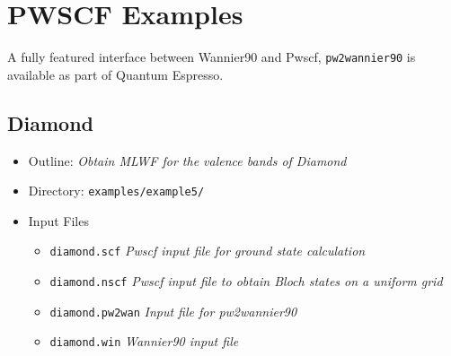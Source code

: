 \documentclass[a4paper,11pt,twoside]{article}
\begin{document}
\cleardoublepage

\section*{PWSCF Examples}

A fully featured interface between Wannier90 and Pwscf, {\tt pw2wannier90} is available as part of  
Quantum Espresso.


\subsection*{Diamond}
\begin{itemize}
\item{Outline: \it{Obtain MLWF for the valence bands of Diamond}}
\item{Directory: {\tt examples/example5/}}
\item{Input Files}
\begin{itemize}
\item{ {\tt diamond.scf}  {\it Pwscf input file for ground state calculation}}
\item{ {\tt diamond.nscf}  {\it Pwscf input file to obtain Bloch states on a uniform grid}}
\item{ {\tt diamond.pw2wan}  {\it Input file for pw2wannier90}}
\item{ {\tt diamond.win}  {\it Wannier90 input file}}
\end{itemize}

\end{itemize}
\end{document}
